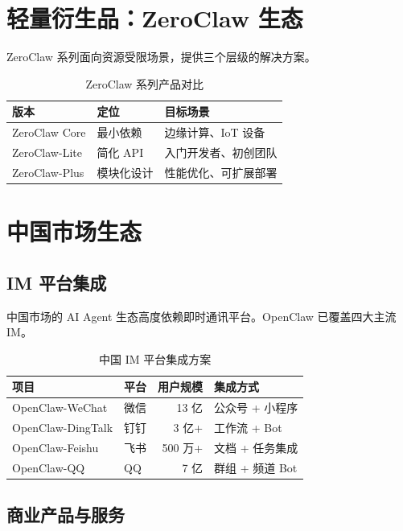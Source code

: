 \documentclass[
  customlatinfont = macos,
]{hkustthesis}
\begin{document}
\section{轻量衍生品：ZeroClaw 生态}

ZeroClaw 系列面向资源受限场景，提供三个层级的解决方案。

\begin{table}[htbp]
\centering
\caption{ZeroClaw 系列产品对比}
\label{tab:zeroclaw}
\begin{tabular}{@{}lll@{}}
\toprule
\textbf{版本} & \textbf{定位} & \textbf{目标场景} \\
\midrule
ZeroClaw Core & 最小依赖 & 边缘计算、IoT 设备 \\
ZeroClaw-Lite & 简化 API  & 入门开发者、初创团队 \\
ZeroClaw-Plus & 模块化设计 & 性能优化、可扩展部署 \\
\bottomrule
\end{tabular}
\end{table}


\section{中国市场生态}

\subsection{IM 平台集成}

中国市场的 AI Agent 生态高度依赖即时通讯平台。OpenClaw 已覆盖四大主流 IM。

\begin{table}[htbp]
\centering
\caption{中国 IM 平台集成方案}
\label{tab:im-integration}
\begin{tabular}{@{}llrl@{}}
\toprule
\textbf{项目} & \textbf{平台} & \textbf{用户规模} & \textbf{集成方式} \\
\midrule
OpenClaw-WeChat   & 微信   & 13 亿  & 公众号 + 小程序  \\
OpenClaw-DingTalk & 钉钉   & 3 亿+  & 工作流 + Bot     \\
OpenClaw-Feishu   & 飞书   & 500 万+ & 文档 + 任务集成  \\
OpenClaw-QQ       & QQ     & 7 亿   & 群组 + 频道 Bot  \\
\bottomrule
\end{tabular}
\end{table}

\subsection{商业产品与服务}
\end{document}
